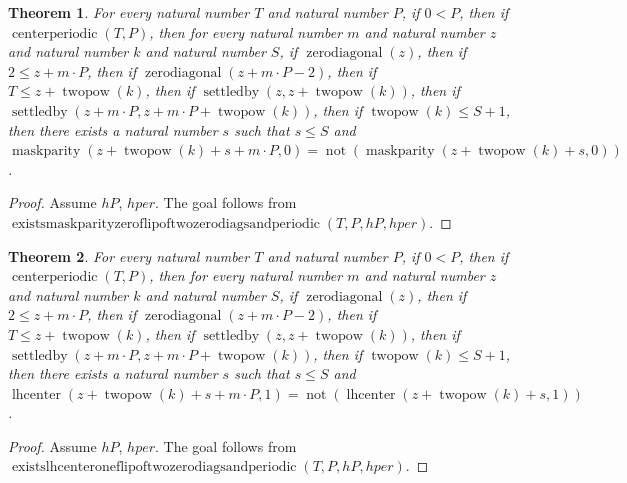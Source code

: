 \documentclass[11pt]{article}
\newtheorem{theorem}{Theorem}[section]
\theoremstyle{definition}
\begin{document}
\begin{theorem}
\label{ll:paper:exists-maskparity-zero-flip-of-two-zero-diags-and-periodic}
For every natural number \(T\) and natural number \(P\), if \(0 < P\), then if \(\operatorname{centerperiodic}(T, P)\), then for every natural number \(m\) and natural number \(z\) and natural number \(k\) and natural number \(S\), if \(\operatorname{zerodiagonal}(z)\), then if \(2 \le z + m \cdot P\), then if \(\operatorname{zerodiagonal}(z + m \cdot P - 2)\), then if \(T \le z + \operatorname{twopow}(k)\), then if \(\operatorname{settledby}(z, z + \operatorname{twopow}(k))\), then if \(\operatorname{settledby}(z + m \cdot P, z + m \cdot P + \operatorname{twopow}(k))\), then if \(\operatorname{twopow}(k) \le S + 1\), then there exists a natural number \(s\) such that \(s \le S\) and \(\operatorname{maskparity}(z + \operatorname{twopow}(k) + s + m \cdot P, 0) = \operatorname{not}(\operatorname{maskparity}(z + \operatorname{twopow}(k) + s, 0))\).
\end{theorem}
\begin{proof}
Assume \(hP\), \(hper\).
The goal follows from \(\operatorname{existsmaskparityzeroflipoftwozerodiagsandperiodic}(T, P, hP, hper)\).
\end{proof}
\begin{theorem}
\label{ll:paper:exists-lhcenter-one-flip-of-two-zero-diags-and-periodic}
For every natural number \(T\) and natural number \(P\), if \(0 < P\), then if \(\operatorname{centerperiodic}(T, P)\), then for every natural number \(m\) and natural number \(z\) and natural number \(k\) and natural number \(S\), if \(\operatorname{zerodiagonal}(z)\), then if \(2 \le z + m \cdot P\), then if \(\operatorname{zerodiagonal}(z + m \cdot P - 2)\), then if \(T \le z + \operatorname{twopow}(k)\), then if \(\operatorname{settledby}(z, z + \operatorname{twopow}(k))\), then if \(\operatorname{settledby}(z + m \cdot P, z + m \cdot P + \operatorname{twopow}(k))\), then if \(\operatorname{twopow}(k) \le S + 1\), then there exists a natural number \(s\) such that \(s \le S\) and \(\operatorname{lhcenter}(z + \operatorname{twopow}(k) + s + m \cdot P, 1) = \operatorname{not}(\operatorname{lhcenter}(z + \operatorname{twopow}(k) + s, 1))\).
\end{theorem}
\begin{proof}
Assume \(hP\), \(hper\).
The goal follows from \(\operatorname{existslhcenteroneflipoftwozerodiagsandperiodic}(T, P, hP, hper)\).
\end{proof}
\end{document}
